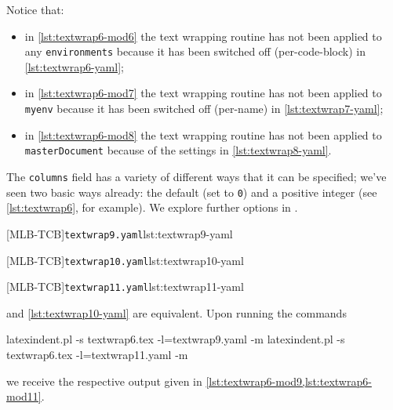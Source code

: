 	Notice that:
	\begin{itemize}
		\item in \cref{lst:textwrap6-mod6} the text wrapping routine has not been applied to any
		      \texttt{environments} because it has been switched off (per-code-block) in
		      \cref{lst:textwrap6-yaml};
		\item in \cref{lst:textwrap6-mod7} the text wrapping routine has not been applied to
		      \texttt{myenv} because it has been switched off (per-name) in
		      \cref{lst:textwrap7-yaml};
		\item in \cref{lst:textwrap6-mod8} the text wrapping routine has not been applied to
		      \texttt{masterDocument} because of the settings in \cref{lst:textwrap8-yaml}.
	\end{itemize}

	The \texttt{columns} field has a variety of different ways that it can be
	specified; we've seen two basic ways already: the default (set to
	\texttt{0}) and a positive integer (see \vref{lst:textwrap6}, for
	example). We explore further options in .

	\begin{adjustwidth}{-3.5cm}{-2.5cm}
		\begin{minipage}{.33\linewidth}
			{\texttt{textwrap9.yaml}}{lst:textwrap9-yaml}
		\end{minipage}%
		\begin{minipage}{.33\linewidth}
			{\texttt{textwrap10.yaml}}{lst:textwrap10-yaml}
		\end{minipage}%
		\begin{minipage}{.33\linewidth}
			{\texttt{textwrap11.yaml}}{lst:textwrap11-yaml}
		\end{minipage}
	\end{adjustwidth}

	 and \cref{lst:textwrap10-yaml} are equivalent. Upon running
	the commands
	\begin{commandshell}
latexindent.pl -s textwrap6.tex -l=textwrap9.yaml -m
latexindent.pl -s textwrap6.tex -l=textwrap11.yaml -m
    \end{commandshell}
	we receive the respective output given in \cref{lst:textwrap6-mod9,lst:textwrap6-mod11}.

	\begin{widepage}

	\end{widepage}

